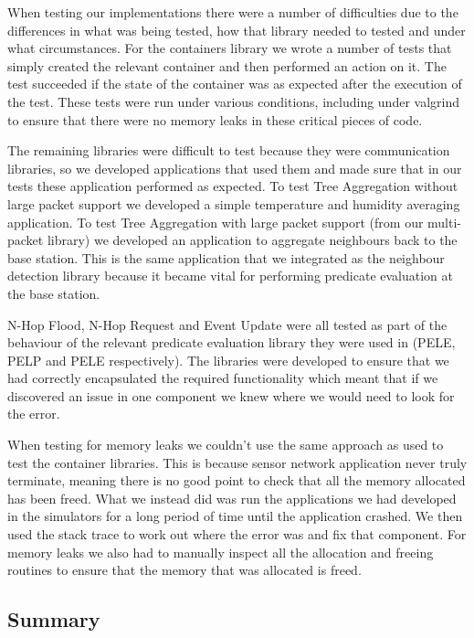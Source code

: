 When testing our implementations there were a number of difficulties due to the differences in what was being tested, how that library needed to tested and under what circumstances. For the containers library we wrote a number of tests that simply created the relevant container and then performed an action on it. The test succeeded if the state of the container was as expected after the execution of the test. These tests were run under various conditions, including under valgrind to ensure that there were no memory leaks in these critical pieces of code.

The remaining libraries were difficult to test because they were communication libraries, so we developed applications that used them and made sure that in our tests these application performed as expected. To test Tree Aggregation without large packet support we developed a simple temperature and humidity averaging application. To test Tree Aggregation with large packet support (from our multi-packet library) we developed an application to aggregate neighbours back to the base station. This is the same application that we integrated as the neighbour detection library because it became vital for performing predicate evaluation at the base station.

N-Hop Flood, N-Hop Request and Event Update were all tested as part of the behaviour of the relevant predicate evaluation library they were used in (PELE, PELP and PELE respectively). The libraries were developed to ensure that we had correctly encapsulated the required functionality which meant that if we discovered an issue in one component we knew where we would need to look for the error.

When testing for memory leaks we couldn't use the same approach as used to test the container libraries. This is because sensor network application never truly terminate, meaning there is no good point to check that all the memory allocated has been freed. What we instead did was run the applications we had developed in the simulators for a long period of time until the application crashed. We then used the stack trace to work out where the error was and fix that component. For memory leaks we also had to manually inspect all the allocation and freeing routines to ensure that the memory that was allocated is freed.


\subsection{Summary}

